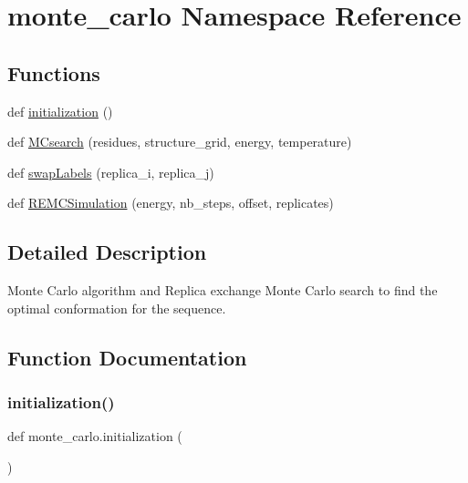 \hypertarget{namespacemonte__carlo}{}\section{monte\+\_\+carlo Namespace Reference}
\label{namespacemonte__carlo}
\subsection*{Functions}
\begin{DoxyCompactItemize}
\item 
def \hyperlink{namespacemonte__carlo_a1afca491d2fa8010974a35019f8929fd}{initialization} ()
\item 
def \hyperlink{namespacemonte__carlo_ab45e8ac7cea8ce87124301b1b3f91141}{M\+Csearch} (residues, structure\+\_\+grid, energy, temperature)
\item 
def \hyperlink{namespacemonte__carlo_a21436e47939949397ec5f7c615200be5}{swap\+Labels} (replica\+\_\+i, replica\+\_\+j)
\item 
def \hyperlink{namespacemonte__carlo_aac5828919d486ac10d193d512f64f42c}{R\+E\+M\+C\+Simulation} (energy, nb\+\_\+steps, offset, replicates)
\end{DoxyCompactItemize}


\subsection{Detailed Description}
\begin{DoxyVerb}    Monte Carlo algorithm and Replica exchange Monte Carlo
    search to find the optimal conformation for the sequence.
\end{DoxyVerb}
 

\subsection{Function Documentation}
\mbox{\label{namespacemonte__carlo_a1afca491d2fa8010974a35019f8929fd}} 
\subsubsection{\texorpdfstring{initialization()}{initialization()}}
{\footnotesize\ttfamily def monte\+\_\+carlo.\+initialization (\begin{DoxyParamCaption}{ }\end{DoxyParamCaption})}


